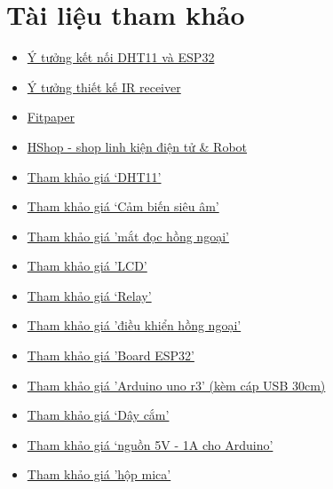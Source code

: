 \documentclass{report}
\begin{document}
\newpage
\section{Tài liệu tham khảo}
\begin{itemize}
    \item 
    \href{https://www.youtube.com/watch?v=eODatazcbaw}{Ý tưởng kết nối DHT11 và ESP32}

    \item
    \href{https://wokwi.com/projects/300028989690348041}{Ý tưởng thiết kế IR receiver}
    
    \item \href{https://tex.stackexchange.com/questions/125135/insert-pages-from-a-pdf-file-to-fit-at-the-entire-page-using-includepdf}{Fitpaper}

    \item \href{https://hshop.vn}{HShop - shop linh kiện điện tử \& Robot}

    \item \href{https://hshop.vn/products/cam-bien-do-am-nhiet-do-dht11-ra-chan}{Tham khảo giá `DHT11'}
    \item \href{https://hshop.vn/products/cam-bien-sieu-am-srf04}{Tham khảo giá `Cảm biến siêu âm'}
    \item \href{https://hshop.vn/products/mat-thu-hong-ngoai-1838}{Tham khảo giá 'mắt đọc hồng ngoại'}
    \item \href{https://hshop.vn/products/lcd-text-lcd1602-xanh-duong}{Tham khảo giá 'LCD'}
    \item \href{https://hshop.vn/products/mach-relay-tre-ic555}{Tham khảo giá `Relay'}
    \item \href{https://hshop.vn/products/dieu-khien-hong-ngoai-ir-remote-control-38khz}{Tham khảo giá 'điều khiển hồng ngoại'}
    \item \href{https://hshop.vn/products/kit-rf-thu-phat-wifi-ble-esp32-s2-nodemcu-32-s2-ai-thinker}{Tham khảo giá 'Board ESP32'}

    \item \href{https://hshop.vn/products/arduino-uno-r3}{Tham khảo giá 'Arduino uno r3' (kèm cáp USB 30cm)}
    \item \href{https://hshop.vn/search?type=product&q=dây%20cắm}{Tham khảo giá `Dây cắm'}
    \item \href{https://dientutuonglai.com/nguon-adapter-5v1a-dau-ra-day-nguon-usb-va-dc5-5.html}{Tham khảo giá `nguồn 5V - 1A cho Arduino'}

    \item \href{https://shp.ee/zau4d86}{Tham khảo giá 'hộp mica'}
    
\end{itemize}
\end{document}
